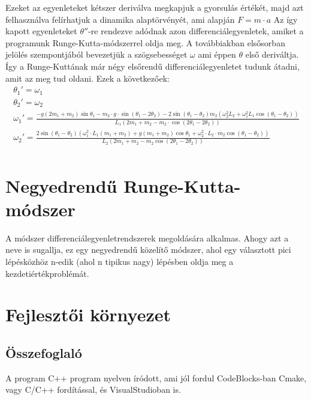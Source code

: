 \documentclass{article}
\begin{document}
Ezeket az egyenleteket kétszer deriválva megkapjuk a gyorsulás értékét, majd azt felhasználva felírhatjuk a dinamika alaptörvényét, ami alapján $F=m \cdot a$ Az így kapott egyenleteket $\theta ''$-re rendezve adódnak azon differenciálegyenletek, amiket a programunk Runge-Kutta-módszerrel oldja meg. A továbbiakban elsősorban jelölés szempontjából bevezetjük a szögsebességet $\omega $ ami éppen $\theta$ első deriváltja. Így a Runge-Kuttának már négy elsőrendű differenciálegyenletet tudunk átadni, amit az meg tud oldani. Ezek a következőek:
\begin{gather*}
\theta_1' = \omega_1 \\
\theta_2' = \omega_2 \\
\omega_1' = \frac{-g(2m_1+m_2)\sin \theta_1 - m_2\cdot g \cdot \sin(\theta_1-2\theta_2) - 2 \sin(\theta_1 - \theta_2)m_2(\omega_2^2 L_2 + \omega_1^2 L_1 \cos(\theta_1 - \theta_2))}{L_1(2m_1 + m_2 - m_2 \cdot \cos(2\theta_1 - 2 \theta_2))} \\
\omega_2'=\frac{2 \sin(\theta_1 - \theta_2)(\omega_1^2 \cdot L_1(m_1+m_2) + g(m_1+m_2) \cos \theta_1 + \omega_2^2 \cdot L_2 \cdot m_2 \cos(\theta_1-\theta_2))}{L_2(2m_1+m_2-m_2\cos(2\theta_1 - 2 \theta_2))} \\
\end{gather*}

\section{Negyedrendű Runge-Kutta-módszer}
A módszer differenciálegyenletrendszerek megoldására alkalmas. Ahogy azt a neve is sugallja, ez egy negyedrendű közelítő módszer, ahol egy választott pici lépésközhöz n-edik (ahol n tipikus nagy) lépésben oldja meg a kezdetiértékproblémát.

\section{Fejlesztői környezet}
\subsection{Összefoglaló}
A program C++ program nyelven íródott, ami jól fordul CodeBlocks-ban Cmake, vagy C/C++ fordítással, és VisualStudioban is.
\end{document}
